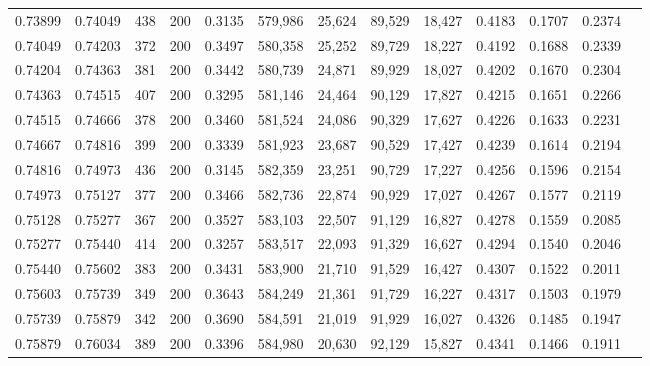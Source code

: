 \begin{tabular}{rrrrrrrrrrrrr}
0.73899 & 0.74049 &   438 & 200 &                                     0.3135 & 579,986 &  25,624 &  89,529 &  18,427 & 0.4183 & 0.1707 & 0.2374 \\
0.74049 & 0.74203 &   372 & 200 &                                     0.3497 & 580,358 &  25,252 &  89,729 &  18,227 & 0.4192 & 0.1688 & 0.2339 \\
0.74204 & 0.74363 &   381 & 200 &                                     0.3442 & 580,739 &  24,871 &  89,929 &  18,027 & 0.4202 & 0.1670 & 0.2304 \\
0.74363 & 0.74515 &   407 & 200 &                                     0.3295 & 581,146 &  24,464 &  90,129 &  17,827 & 0.4215 & 0.1651 & 0.2266 \\
0.74515 & 0.74666 &   378 & 200 &                                     0.3460 & 581,524 &  24,086 &  90,329 &  17,627 & 0.4226 & 0.1633 & 0.2231 \\
0.74667 & 0.74816 &   399 & 200 &                                     0.3339 & 581,923 &  23,687 &  90,529 &  17,427 & 0.4239 & 0.1614 & 0.2194 \\
0.74816 & 0.74973 &   436 & 200 &                                     0.3145 & 582,359 &  23,251 &  90,729 &  17,227 & 0.4256 & 0.1596 & 0.2154 \\
0.74973 & 0.75127 &   377 & 200 &                                     0.3466 & 582,736 &  22,874 &  90,929 &  17,027 & 0.4267 & 0.1577 & 0.2119 \\
0.75128 & 0.75277 &   367 & 200 &                                     0.3527 & 583,103 &  22,507 &  91,129 &  16,827 & 0.4278 & 0.1559 & 0.2085 \\
0.75277 & 0.75440 &   414 & 200 &                                     0.3257 & 583,517 &  22,093 &  91,329 &  16,627 & 0.4294 & 0.1540 & 0.2046 \\
0.75440 & 0.75602 &   383 & 200 &                                     0.3431 & 583,900 &  21,710 &  91,529 &  16,427 & 0.4307 & 0.1522 & 0.2011 \\
0.75603 & 0.75739 &   349 & 200 &                                     0.3643 & 584,249 &  21,361 &  91,729 &  16,227 & 0.4317 & 0.1503 & 0.1979 \\
0.75739 & 0.75879 &   342 & 200 &                                     0.3690 & 584,591 &  21,019 &  91,929 &  16,027 & 0.4326 & 0.1485 & 0.1947 \\
0.75879 & 0.76034 &   389 & 200 &                                     0.3396 & 584,980 &  20,630 &  92,129 &  15,827 & 0.4341 & 0.1466 & 0.1911 \\

\end{tabular}
